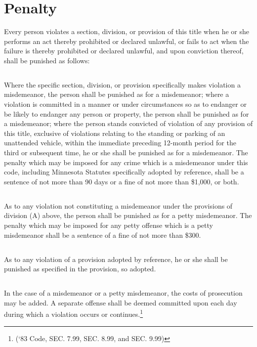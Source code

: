 \setcounter{section}{98}
\section{Penalty}
Every person violates a section, division, or provision of this title when he or she performs an act thereby prohibited or declared unlawful, or fails to act when the failure is thereby prohibited or declared unlawful, and upon conviction thereof, shall be punished as follows:
\subsection{}
Where the specific section, division, or provision specifically makes violation a misdemeanor, the person shall be punished as for a misdemeanor; where a violation is committed in a manner or under circumstances so as to endanger or be likely to endanger any person or property, the person shall be punished as for a misdemeanor; where the person stands convicted of violation of any provision of this title, exclusive of violations relating to the standing or parking of an unattended vehicle, within the immediate preceding 12-month period for the third or subsequent time, he or she shall be punished as for a misdemeanor.  The penalty which may be imposed for any crime which is a misdemeanor under this code, including Minnesota Statutes specifically adopted by reference, shall be a sentence of not more than 90 days or a fine of not more than \$1,000, or both.
\subsection{}
As to any violation not constituting a misdemeanor under the provisions of division (A) above,  the person shall be punished as for a petty misdemeanor.  The penalty which may be imposed for any petty offense which is a petty misdemeanor shall be a sentence of a fine of not more than \$300.
\subsection{}
As to any violation of a provision adopted by reference, he or she shall be punished as specified in the provision, so adopted.
\subsection{}
In the case of a misdemeanor or a petty misdemeanor, the costs of prosecution may be added.  A separate offense shall be deemed committed upon each day during which a violation occurs or continues.\footnote{(‘83 Code, SEC. 7.99, SEC. 8.99, and SEC. 9.99)}
